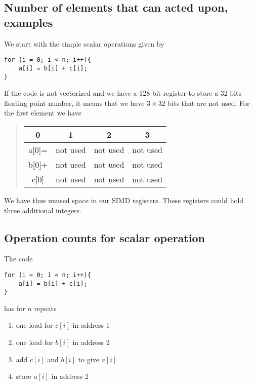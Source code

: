 \noindent
\subsection*{Number of elements that can acted upon, examples}
We start with the simple scalar operations given by




\begin{verbatim}
for (i = 0; i < n; i++){
    a[i] = b[i] + c[i];
}

\end{verbatim}

If the code is not vectorized  and we have a 128-bit register to store a 32 bits floating point number,
it means that we have $3\times 32$ bits that are not used. For the first element we have


\begin{quote}
\begin{tabular}{cccc}
\hline
\multicolumn{1}{c}{ 0 } & \multicolumn{1}{c}{ 1 } & \multicolumn{1}{c}{ 2 } & \multicolumn{1}{c}{ 3 } \\
\hline
a[0]= & not used & not used & not used \\
\hline
b[0]+ & not used & not used & not used \\
\hline
c[0]  & not used & not used & not used \\
\hline
\end{tabular}
\end{quote}

\noindent
We have thus unused space in our SIMD registers. These registers could hold three additional integers.

\subsection*{Operation counts for scalar operation}
The code




\begin{verbatim}
for (i = 0; i < n; i++){
    a[i] = b[i] + c[i];
}

\end{verbatim}

has for $n$ repeats
\begin{enumerate}
\item one load for $c[i]$ in address 1

\item one load for $b[i]$ in address 2

\item add $c[i]$ and $b[i]$ to give $a[i]$

\item store $a[i]$ in address 2
\end{enumerate}

